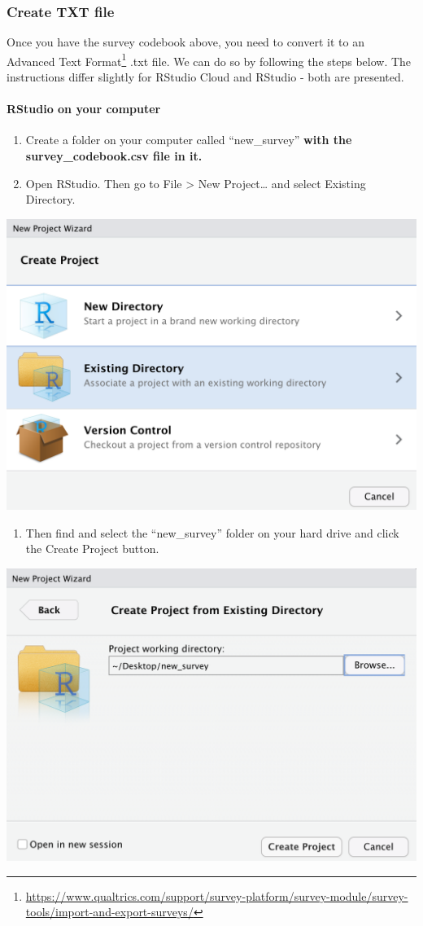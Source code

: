 \documentclass[
]{krantz}
\providecommand{\tightlist}{%
  \setlength{\itemsep}{0pt}\setlength{\parskip}{0pt}}
\renewcommand{\href}[2]{#2\footnote{\url{#1}}}
\begin{document}
\hypertarget{create-txt-file}{%
\subsubsection{Create TXT file}\label{create-txt-file}}

Once you have the survey codebook above, you need to convert it to an \href{https://www.qualtrics.com/support/survey-platform/survey-module/survey-tools/import-and-export-surveys/}{Advanced Text Format} .txt file. We can do so by following the steps below. The instructions differ slightly for RStudio Cloud and RStudio - both are presented.

\hypertarget{rstudio-on-your-computer}{%
\paragraph{RStudio on your computer}\label{rstudio-on-your-computer}}

\begin{enumerate}
\def\labelenumi{\arabic{enumi}.}
\item
  Create a folder on your computer called ``new\_survey'' \textbf{with the survey\_codebook.csv file in it.}
\item
  Open RStudio. Then go to File \textgreater{} New Project\ldots{} and select Existing Directory.
\end{enumerate}

\includegraphics[width=0.5\linewidth]{ch_qualtrics/images/screenshot_existing_dir}

\begin{enumerate}
\def\labelenumi{\arabic{enumi}.}
\setcounter{enumi}{1}
\tightlist
\item
  Then find and select the ``new\_survey'' folder on your hard drive and click the Create Project button.
\end{enumerate}

\includegraphics[width=0.5\linewidth]{ch_qualtrics/images/screenshot_folder}
\end{document}
